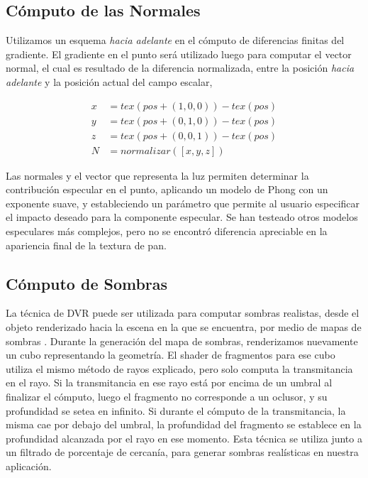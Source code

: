 \subsection{Cómputo de las Normales}
Utilizamos un esquema {\em hacia adelante} en el cómputo de diferencias finitas del gradiente.
El gradiente en el punto será utilizado luego para computar el vector normal, el cual es resultado de la diferencia normalizada, entre la posición {\em hacia adelante} y la posición actual del campo escalar,


\begin{equation}
\begin{aligned}
x &= tex(pos+(1,0,0)) - tex(pos)\\
y &= tex(pos+(0,1,0)) - tex(pos)\\
z &= tex(pos+(0,0,1)) - tex(pos) \\
N &= normalizar([x,y,z])
\end{aligned}
\end{equation}

Las normales y el vector que representa la luz permiten determinar la contribución especular en el punto, aplicando un modelo de Phong con un exponente suave, y estableciendo un parámetro que permite al usuario especificar el impacto deseado para la componente especular.
Se han testeado otros modelos especulares más complejos, pero no se encontró diferencia apreciable en la apariencia final de la textura de pan.

\subsection{Cómputo de Sombras}
La técnica de DVR puede ser utilizada para computar sombras realistas, desde el objeto renderizado hacia la escena en la que se encuentra, por medio de mapas de sombras \cite{Williams1978}.
Durante la generación del mapa de sombras, renderizamos nuevamente un cubo representando la geometría.
El shader de fragmentos para ese cubo utiliza el mismo método de rayos explicado, pero solo computa la transmitancia en el rayo.
Si la transmitancia en ese rayo está por encima de un umbral al finalizar el cómputo, luego el fragmento no corresponde a un oclusor, y su profundidad se setea en infinito.
Si durante el cómputo de la transmitancia, la misma cae por debajo del umbral, la profundidad del fragmento se establece en la profundidad alcanzada por el rayo en ese momento.
Esta técnica se utiliza junto a un filtrado de porcentaje de cercanía, para generar sombras realísticas en nuestra aplicación.


